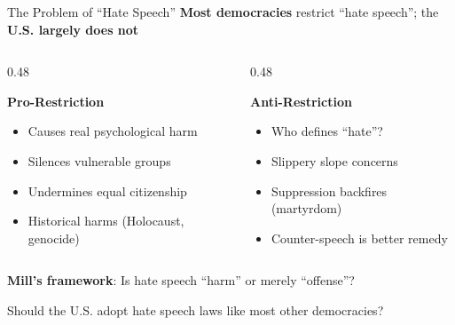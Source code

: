 ﻿\documentclass[aspectratio=169,11pt]{beamer}
\begin{document}
\begin{frame}{The Problem of ``Hate Speech''}
\textbf{Most democracies} restrict ``hate speech''; the \textbf{U.S. largely does not}

\vspace{0.2cm}
\begin{columns}[T]
\begin{column}{0.48\textwidth}
\begin{block}{\textbf{Pro-Restriction}}
\begin{itemize}
    \item Causes real psychological harm
    \item Silences vulnerable groups
    \item Undermines equal citizenship
    \item Historical harms (Holocaust, genocide)
\end{itemize}
\end{block}
\end{column}

\begin{column}{0.48\textwidth}
\begin{block}{\textbf{Anti-Restriction}}
\begin{itemize}
    \item Who defines ``hate''?
    \item Slippery slope concerns
    \item Suppression backfires (martyrdom)
    \item Counter-speech is better remedy
\end{itemize}
\end{block}
\end{column}
\end{columns}

\vspace{0.3cm}
\textbf{Mill's framework}: Is hate speech ``harm'' or merely ``offense''?

\begin{discussionbox}[Discussion]
Should the U.S. adopt hate speech laws like most other democracies?
\end{discussionbox}
\end{frame}
\end{document}

